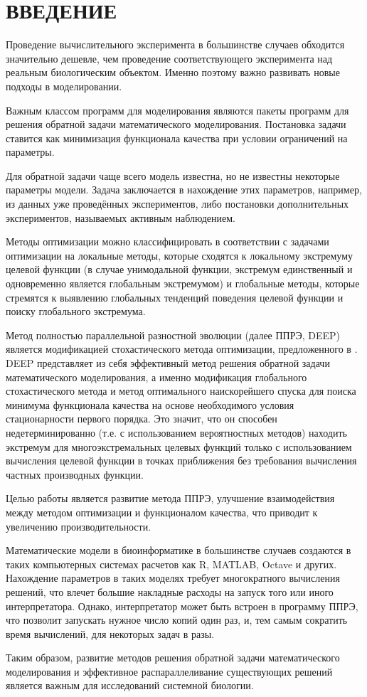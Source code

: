 \chapter*{ВВЕДЕНИЕ}

Проведение вычислительного эксперимента
в большинстве случаев обходится значительно дешевле,
чем проведение соответствующего эксперимента
над реальным биологическим объектом.
Именно поэтому важно развивать новые подходы в моделировании.

Важным классом программ для моделирования
являются пакеты программ
для решения обратной задачи математического моделирования.
Постановка задачи ставится
как минимизация функционала качества
при условии ограничений на параметры.

Для обратной задачи чаще всего модель известна,
но не известны некоторые параметры модели.
Задача заключается в нахождение этих параметров,
например, из данных уже проведённых экспериментов,
либо постановки дополнительных экспериментов,
называемых активным наблюдением.

Методы оптимизации можно классифицировать
в соответствии с задачами оптимизации
на локальные методы,
которые сходятся к локальному экстремуму целевой функции
(в случае унимодальной функции,
экстремум единственный и одновременно
является глобальным экстремумом)
и глобальные методы,
которые стремятся к выявлению
глобальных тенденций поведения целевой функции
и поиску глобального экстремума.

Метод полностью параллельной разностной эволюции
(далее ППРЭ, DEEP) \cite{Kozlov11, Kozlov13}
является модификацией стохастического метода оптимизации,
предложенного в \cite{Storn95}.
DEEP представляет из себя эффективный метод
решения обратной задачи математического моделирования,
а именно модификация глобального стохастического метода
и метод оптимального наискорейшего спуска
для поиска минимума функционала качества
на основе необходимого условия стационарности первого порядка.
Это значит, что он способен недетерминированно
(т.е. с использованием вероятностных методов)
находить экстремум для многоэкстремальных целевых функций
только с использованием вычисления целевой функции
в точках приближения без требования вычисления частных производных функции.

Целью работы является развитие метода ППРЭ,
улучшение взаимодействия между
методом оптимизации и функционалом качества,
что приводит к увеличению производительности.

Математические модели в биоинформатике
в большинстве случаев создаются
в таких компьютерных системах расчетов
как R, MATLAB, Octave и других.
Нахождение параметров в таких моделях
требует многократного вычисления решений,
что влечет большие накладные расходы на запуск
того или иного интерпретатора.
Однако, интерпретатор может быть встроен в программу ППРЭ,
что позволит запускать нужное число копий один раз,
и, тем самым сократить время вычислений, для некоторых задач в разы.

Таким образом,
развитие методов решения обратной задачи математического моделирования
и эффективное распараллеливание существующих решений
является важным для исследований системной биологии.

